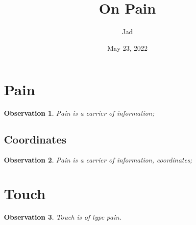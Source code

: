 \documentclass[11pt]{article}
\author{Jad}
\date{May 23, 2022}
\title{On Pain}
\begin{document}
\maketitle
\newtheorem*{observation}{Observation}

\section{Pain}
\label{sec:org5d6b03a}
\begin{observation}
Pain is a carrier of information;
\end{observation}

\subsection{Coordinates}
\label{sec:org5a0adcb}
\begin{observation}
Pain is a carrier of information, coordinates;
\end{observation}

\section{Touch}
\label{sec:orge5d0c90}
\begin{observation}
Touch is of type pain.
\end{observation}
\end{document}

